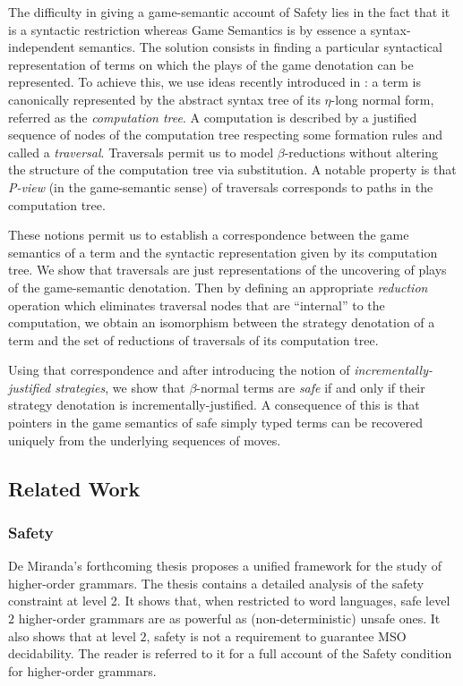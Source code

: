 \documentclass{llncs}
\begin{document}
The difficulty in giving a game-semantic account of Safety lies in
the fact that it is a syntactic restriction whereas Game Semantics
is by essence a syntax-independent semantics. The solution consists
in finding a particular syntactical representation of terms on which
the plays of the game denotation can be represented.
To achieve this, we use ideas recently introduced in \cite{OngLics2006}: a term
is canonically represented by the abstract syntax tree of its
$\eta$-long normal form, referred as the \emph{computation tree}. A
computation is described by a justified sequence of nodes of the
computation tree respecting some formation rules and called a
\emph{traversal}. Traversals permit us to model $\beta$-reductions
without altering the structure of the computation tree via
substitution. A notable property is that \emph{P-view} (in the game-semantic sense) of traversals
corresponds to paths in the computation tree.

These notions permit us to establish a correspondence between the game semantics of a term and
the syntactic representation given by its computation tree.
We show that traversals are just representations of the
uncovering of plays of the game-semantic denotation.
Then by defining an appropriate \emph{reduction} operation which eliminates traversal
nodes that are ``internal'' to the computation, we obtain an
isomorphism between the strategy denotation of a term and the set of
reductions of traversals of its computation tree.

Using that correspondence and after introducing the notion of \emph{incrementally-justified
strategies}, we show that $\beta$-normal terms are \emph{safe} if and only if
their strategy denotation is incrementally-justified.
A consequence of this is that pointers in the game semantics of safe simply typed terms can be recovered uniquely from the underlying sequences of moves.

\subsection{Related Work}

\subsubsection{Safety}

De Miranda's forthcoming thesis \cite{demirandathesis} proposes a unified framework for the study of higher-order grammars. The thesis contains a detailed analysis of the safety constraint at level 2. It shows that, when restricted to word languages, safe level $2$ higher-order grammars are as powerful as (non-deterministic) unsafe ones. It also shows that at level $2$, safety is not a requirement to guarantee MSO decidability. The reader is referred to it for a full account of the Safety condition for higher-order grammars.
\end{document}

